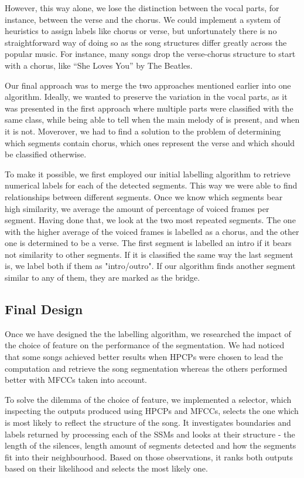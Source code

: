 However, this way alone, we lose the distinction between the vocal parts, for instance, between the verse and the chorus. We could implement a system of heuristics to assign labels like chorus or verse, but unfortunately there is no straightforward way of doing so as the song structures differ greatly across the popular music. For instance, many songs drop the verse-chorus structure to start with a chorus, like ``She Loves You'' by The Beatles.

Our final approach was to merge the two approaches mentioned earlier into one algorithm. Ideally, we wanted to preserve the variation in the vocal parts, as it was presented in the first approach where multiple parts were classified with the same class, while being able to tell when the main melody of is present, and when it is not. Moverover, we had to find a solution to the problem of determining which segments contain chorus, which ones represent the verse and which should be classified otherwise.


To make it possible, we first employed our initial labelling algorithm to retrieve numerical labels for each of the detected segments. This way we were able to find relationships between different segments. Once we know which segments bear high similarity, we average the amount of percentage of voiced frames per segment. Having done that, we look at the two most repeated segments. The one with the higher average of the voiced frames is labelled as a chorus, and the other one is determined to be a verse. The first segment is labelled an intro if it bears not similarity to other segments. If it is classified the same way the last segment is, we label both if them as "intro/outro". If our algorithm finds another segment similar to any of them, they are marked as the bridge.

\vspace{10pt}


\subsection{Final Design}

Once we have designed the the labelling algorithm, we researched the impact of the choice of feature on the performance of the segmentation. We had noticed that some songs achieved better results when HPCPs were chosen to lead the computation and retrieve the song segmentation whereas the others performed better with MFCCs taken into account. 

To solve the dilemma of the choice of feature, we implemented a selector, which inspecting the outputs produced using HPCPs and MFCCs, selects the one which is most likely to reflect the structure of the song. It investigates boundaries and labels returned by processing each of the SSMs and looks at their structure - the length of the silences, length amount of segments detected and how the segments fit into their neighbourhood. Based on those observations, it ranks both outputs based on their likelihood and selects the most likely one. 

